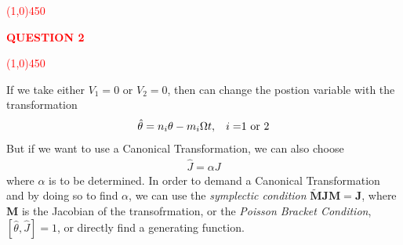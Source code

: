 %
%
%
\textcolor{red}{
\line(1,0){450}\\
\begin{center}
	\textbf{QUESTION 2}
\end{center}
\line(1,0){450}\\
}
%
%
%
%
%
If we take either $V_1=0$ or $V_2=0$, then can change the postion variable with the transformation 
	\begin{align}\label{eq2.9}
		\hat{\theta} = n_i\theta-m_i\Omega t, \text{\hspace{.3cm}$i=$1 or 2}
	\end{align}
But if we want to use a Canonical Transformation, we can also choose 
	\begin{align}\label{eq2.10}
		\hat{J} = \alpha J 
	\end{align}
where $\alpha$ is to be determined. In order to demand a Canonical Transformation and by doing so to find $\alpha$, we can use the \textit{symplectic condition} $\tilde{\bm{M}}\bm{J}\bm{M} = \bm{J}$, where $\bm{M}$ is the Jacobian of the transofrmation, or the \textit{Poisson Bracket Condition}, $[\hat{\theta},\hat{J}]=1$, or directly find a generating function. 

